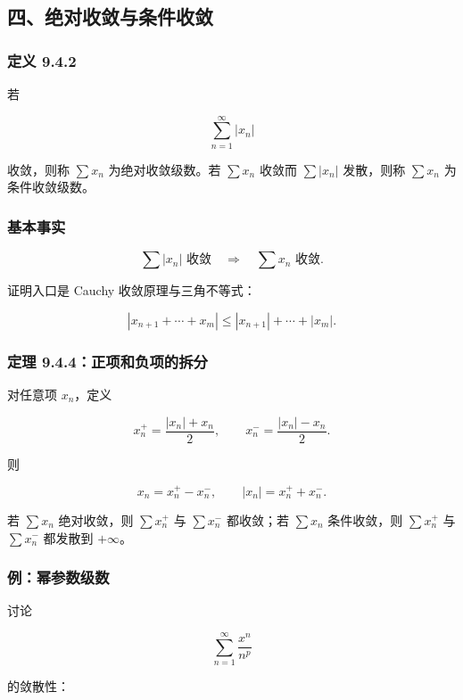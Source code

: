 \subsection*{四、绝对收敛与条件收敛}

\subsubsection*{定义 9.4.2}

若

\[
      \sum_{n=1}^{\infty}|x_n|
    \]

收敛，则称 \(\sum x_n\) 为绝对收敛级数。若 \(\sum x_n\) 收敛而 \(\sum |x_n|\) 发散，则称 \(\sum x_n\) 为条件收敛级数。

\subsubsection*{基本事实}

\[
      \sum |x_n|\text{ 收敛}\quad\Longrightarrow\quad \sum x_n\text{ 收敛}.
    \]

证明入口是 Cauchy 收敛原理与三角不等式：

\[
      \left|x_{n+1}+\cdots+x_m\right|
      \le
      |x_{n+1}|+\cdots+|x_m|.
    \]

\subsubsection*{定理 9.4.4：正项和负项的拆分}

对任意项 \(x_n\)，定义

\[
      x_n^+=\frac{|x_n|+x_n}{2},\qquad
      x_n^-=\frac{|x_n|-x_n}{2}.
    \]

则

\[
      x_n=x_n^+-x_n^-,\qquad |x_n|=x_n^++x_n^-.
    \]

若 \(\sum x_n\) 绝对收敛，则 \(\sum x_n^+\) 与 \(\sum x_n^-\) 都收敛；若 \(\sum x_n\) 条件收敛，则 \(\sum x_n^+\) 与 \(\sum x_n^-\) 都发散到 \(+\infty\)。

\subsubsection*{例：幂参数级数}

讨论

\[
      \sum_{n=1}^{\infty}\frac{x^n}{n^p}
    \]

的敛散性：

